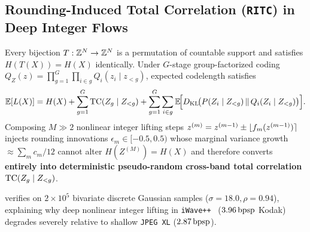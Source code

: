 \subsection{Rounding-Induced Total Correlation (\texttt{RITC}) in Deep Integer Flows}
\begin{theorem}
\label{thm:ritc}
Every bijection $T: \mathbb{Z}^N \to \mathbb{Z}^N$ is a permutation of countable support and satisfies $H(T(X)) = H(X)$ identically. Under $G$-stage group-factorized coding $Q_Z(z) = \prod_{g=1}^G \prod_{i \in g} Q_i(z_i \mid z_{<g})$, expected codelength satisfies
\begin{equation}
  \mathbb{E}[L(X)] = H(X) + \sum_{g=1}^G \operatorname{TC}(Z_g \mid Z_{<g}) + \sum_{g=1}^G \sum_{i \in g} \mathbb{E}\!\Big[D_{\mathrm{KL}}\!\big(P(Z_i \mid Z_{<g}) \,\|\, Q_i(Z_i \mid Z_{<g})\big)\Big].
\end{equation}
Composing $M \gg 2$ nonlinear integer lifting steps $z^{(m)} = z^{(m-1)} \pm \lfloor f_m(z^{(m-1)}) \rceil$ injects rounding innovations $\epsilon_m \in [-0.5, 0.5)$ whose marginal variance growth $\approx \sum_m c_m/12$ cannot alter $H(Z^{(M)}) = H(X)$ and therefore converts \textbf{entirely into deterministic pseudo-random cross-band total correlation $\operatorname{TC}(Z_g \mid Z_{<g})$}.
\end{theorem}

 verifies  on $2\times 10^5$ bivariate discrete Gaussian samples ($\sigma=18.0,\rho=0.94$), explaining why deep nonlinear integer lifting in \texttt{iWave++}~\citep{ma2020iwave} ($3.96\,\mathrm{bpsp}$ Kodak) degrades severely relative to shallow \texttt{JPEG~XL} ($2.87\,\mathrm{bpsp}$).

\begin{table}[htbp]
\centering
\caption{Numerical verification of  (\texttt{RITC}): joint discrete entropy is strictly invariant across depth $M$, while stacked nonlinear rounding inflates factorized codelength.}
\label{tab:ritc-audit}
\vspace{2pt}
\end{table}

